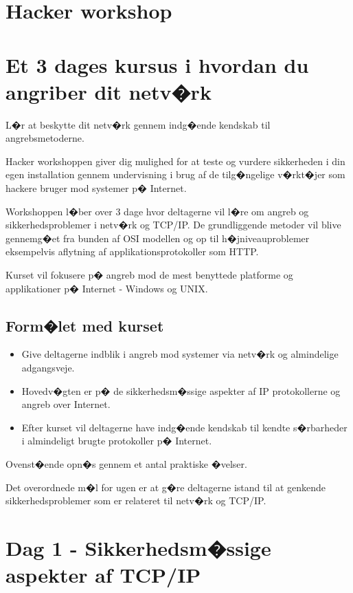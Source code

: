 \documentclass[a4paper,12pt]{article}
\begin{document}
\section{Hacker workshop}

\section{Et 3 dages kursus i hvordan du angriber dit netv�rk}

L�r at beskytte dit netv�rk gennem indg�ende kendskab til
angrebsmetoderne.

Hacker workshoppen giver dig mulighed for at teste og vurdere
sikkerheden i din egen installation gennem undervisning i brug af de
tilg�ngelige v�rkt�jer som hackere bruger mod systemer p� Internet.

Workshoppen l�ber over 3 dage hvor deltagerne vil l�re om angreb og
sikkerhedsproblemer i netv�rk og TCP/IP. De grundliggende metoder vil blive
gennemg�et fra bunden af OSI modellen og op til h�jniveauproblemer
eksempelvis aflytning af applikationsprotokoller som HTTP.

Kurset vil fokusere p� angreb mod de mest benyttede platforme og
applikationer p� Internet - Windows og UNIX.

\subsection{Form�let med kurset}
\begin{itemize}
\item Give deltagerne indblik i angreb mod systemer via netv�rk og
almindelige adgangsveje.

\item Hovedv�gten er p� de sikkerhedsm�ssige aspekter af IP protokollerne og
angreb over Internet.

\item Efter kurset vil deltagerne have indg�ende kendskab til kendte
s�rbarheder i almindeligt brugte protokoller p� Internet.
\end{itemize}

Ovenst�ende opn�s gennem et antal praktiske �velser.

Det overordnede m�l for ugen er at g�re deltagerne istand til
at genkende sikkerhedsproblemer som er relateret til netv�rk og TCP/IP.


\section{Dag 1 - Sikkerhedsm�ssige aspekter af TCP/IP}
\end{document}
